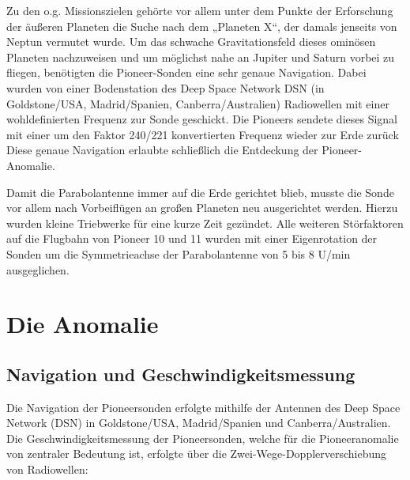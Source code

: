 \documentclass[a4paper,10pt]{article}
\begin{document}
Zu den o.g. Missionszielen gehörte vor allem unter dem Punkte der Erforschung der äußeren Planeten die Suche nach dem
„Planeten X“, der damals jenseits von Neptun vermutet wurde. Um das schwache Gravitationsfeld dieses ominösen Planeten
nachzuweisen und um möglichst nahe an Jupiter und Saturn vorbei zu fliegen, benötigten die Pioneer-Sonden eine sehr
genaue Navigation. Dabei wurden von einer Bodenstation des Deep Space Network DSN (in Goldstone/USA, Madrid/Spanien,
Canberra/Australien) Radiowellen mit einer wohldefinierten Frequenz zur Sonde geschickt. Die Pioneers sendete dieses
Signal mit einer um den Faktor 240/221 konvertierten Frequenz wieder zur Erde zurück\cite{Dittus2006} Diese genaue
Navigation erlaubte schließlich die Entdeckung der Pioneer-Anomalie. 

Damit die Parabolantenne immer auf die Erde gerichtet blieb, musste die Sonde vor allem nach Vorbeiflügen an großen
Planeten neu ausgerichtet werden. Hierzu wurden kleine Triebwerke für eine kurze Zeit gezündet. Alle weiteren
Störfaktoren auf die Flugbahn von Pioneer 10 und 11 wurden mit einer Eigenrotation der Sonden um die Symmetrieachse der
Parabolantenne von 5 bis 8 U/min ausgeglichen.


\section{Die Anomalie}
\subsection{Navigation und Geschwindigkeitsmessung}
Die Navigation der Pioneersonden erfolgte mithilfe der Antennen des Deep Space Network (DSN) in Goldstone/USA, Madrid/Spanien und Canberra/Australien.
Die Geschwindigkeitsmessung der Pioneersonden, welche für die Pioneeranomalie von zentraler Bedeutung ist, erfolgte über die Zwei-Wege-Dopplerverschiebung von Radiowellen:
\end{document}
